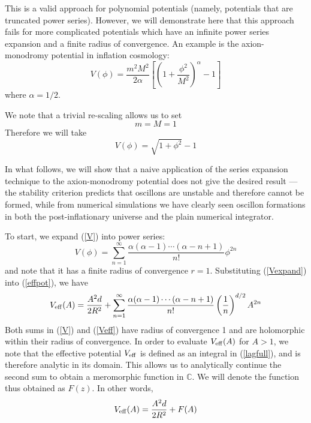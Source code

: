 \documentclass{report}
\begin{document}
This is a valid approach for polynomial potentials (namely, potentials that are truncated power series). However, we will demonstrate here that this approach fails for more complicated potentials which have an infinite power series expansion and a finite radius of convergence. An example is the axion-monodromy potential in inflation cosmology:
\begin{equation}
  V(\phi) = \frac{m^2M^2}{2\alpha}\left[\left(1+\frac{\phi^2}{M^2}\right)^\alpha-1\right]
\end{equation}
where $\alpha=1/2$.

We note that a trivial re-scaling allows us to set
\begin{equation}
  m=M=1
\end{equation}
Therefore we will take
\begin{equation}\label{V}
  V(\phi)=\sqrt{1+\phi^2}-1
\end{equation}

In what follows, we will show that a naive application of the series expansion technique to the axion-monodromy potential does not give the desired result --- the stability criterion predicts that oscillons are unstable and therefore cannot be formed, while from numerical simulations we have clearly seen oscillon formations in both the post-inflationary universe and the plain numerical integrator.

To start, we expand (\ref{V}) into power series:
\begin{equation}\label{Vexpand}
  V(\phi)=\sum_{n=1}^\infty\frac{\alpha(\alpha-1)\cdots(\alpha-n+1)}{n!}\phi^{2n}
\end{equation}
and note that it has a finite radius of convergence $r=1$. Substituting (\ref{Vexpand}) into (\ref{effpot}), we have
\begin{equation}\label{Veff}
  V_{\rm eff}(A)=\frac{A^2d}{2R^2} + \sum_{n=1}^\infty\frac{\alpha(\alpha-1)\cdots(\alpha-n+1)}{n!}
  \left(\frac{1}{n}\right)^{d/2}A^{2n}
\end{equation}
Both sums in (\ref{V}) and (\ref{Veff}) have radius of convergence 1 and are holomorphic within their radius of convergence. In order to evaluate $V_{\rm eff}(A)$ for $A>1$, we note that the effective potential $V_{\rm eff}$ is defined as an integral in (\ref{lagfull}), and is therefore analytic in its domain. This allows us to analytically continue the second sum to obtain a meromorphic function in $\mathbb{C}$. We will denote the function thus obtained as $F(z)$. In other words,
\begin{equation}\label{VeffFz}
  V_{\rm eff}(A) = \frac{A^2d}{2R^2} + F(A)
\end{equation}
\end{document}
